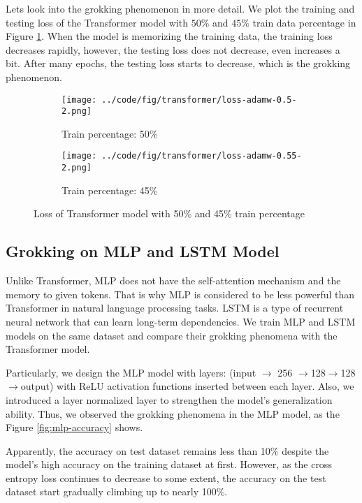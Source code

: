 \documentclass{article}
\begin{document}
Lets look into the grokking phenomenon in more detail. We plot the training and testing loss of the Transformer model with $50\%$ and $45\%$ train data percentage in Figure \ref{fig:transformer-loss}. When the model is memorizing the training data, the training loss decreases rapidly, however, the testing loss does not decrease, even increases a bit. After many epochs, the testing loss starts to decrease, which is the grokking phenomenon.

\begin{figure}[ht]
    \centering
    \begin{subfigure}{0.45\textwidth}
        \texttt{[image: ../code/fig/transformer/loss-adamw-0.5-2.png]}
        \caption{Train percentage: 50\%}
    \end{subfigure}
    \begin{subfigure}{0.45\textwidth}
        \texttt{[image: ../code/fig/transformer/loss-adamw-0.55-2.png]}
        \caption{Train percentage: 45\%}
    \end{subfigure}
    \caption{Loss of Transformer model with 50\% and 45\% train percentage}
    \label{fig:transformer-loss}
\end{figure}

\subsection{Grokking on MLP and LSTM Model}

Unlike Transformer, MLP does not have the self-attention mechanism and the memory to given tokens. That is why MLP is considered to be less powerful than Transformer in natural language processing tasks. LSTM is a type of recurrent neural network that can learn long-term dependencies. We train MLP and LSTM models on the same dataset and compare their grokking phenomena with the Transformer model.

Particularly, we design the MLP model with layers: (input $\rightarrow$ 256 $\rightarrow $128$ \rightarrow $128$ \rightarrow $output) with ReLU activation functions inserted between each layer. Also, we introduced a layer normalized layer to strengthen the model's generalization ability. Thus, we observed the grokking phenomena in the MLP model, as the Figure \ref{fig:mlp-accuracy} shows.

Apparently, the accuracy on test dataset remains less than 10\% despite the model's high accuracy on the training dataset at first. However, as the cross entropy loss continues to decrease to some extent, the accuracy on the test dataset start gradually climbing up to nearly 100\%.
\end{document}

